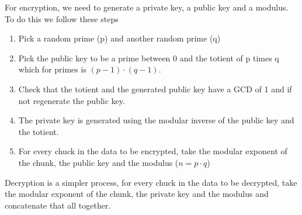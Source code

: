\documentclass[journal,a4paper]{IEEEtran}
\begin{document}
For encryption, we need to generate a private key, a public key and a modulus. To do this we follow these steps
\begin{enumerate}
	\item Pick a random prime (p) and another random prime (q)
	\item Pick the public key to be a prime between 0 and the totient of p times q which for primes is $(p-1)\cdot (q-1)$.
	\item Check that the totient and the generated public key have a GCD of 1 and if not regenerate the public key.
	\item The private key is generated using the modular inverse of the public key and the totient.
	\item For every chuck in the data to be encrypted, take the modular exponent of the chunk, the public key and the modulus ($n = p\cdot q$)
\end{enumerate}

Decryption is a simpler process, for every chuck in the data to be decrypted, take the modular exponent of the chunk, the private key and the modulus and concatenate that all together.
\end{document}
